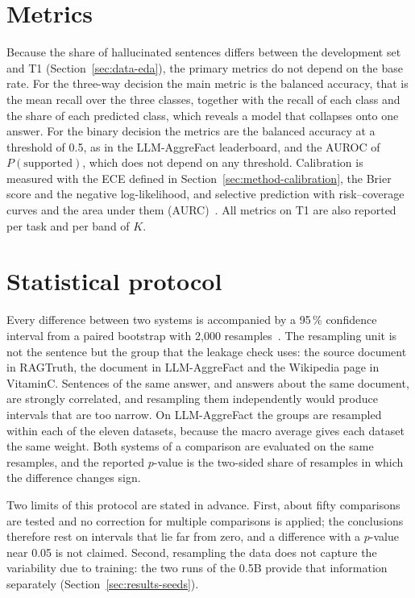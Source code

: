 \section{Metrics}
\label{sec:setup-metrics}

Because the share of hallucinated sentences differs between the development set and T1
(Section~\ref{sec:data-eda}), the primary metrics do not depend on the base rate. For the three-way decision the main
metric is the balanced accuracy, that is the mean recall over the three classes, together with the recall of each class
and the share of each predicted class, which reveals a model that collapses onto one answer. For the binary decision
the metrics are the balanced accuracy at a threshold of 0.5, as in the LLM-AggreFact leaderboard, and the AUROC of
$P(\text{supported})$, which does not depend on any threshold. Calibration is measured with the ECE defined in
Section~\ref{sec:method-calibration}, the Brier score and the negative log-likelihood, and selective prediction with
risk--coverage curves and the area under them (AURC)~\cite{geifman2017selective}. All metrics on T1 are also reported
per task and per band of $K$.

\section{Statistical protocol}
\label{sec:setup-statistics}

Every difference between two systems is accompanied by a 95\,\% confidence interval from a paired bootstrap with 2{,}000
resamples~\cite{koehn2004significance,bergkirkpatrick2012significance,dror2018hitchhiker}. The resampling unit is not the
sentence but the group that the leakage check uses: the source document in RAGTruth, the document in LLM-AggreFact and
the Wikipedia page in VitaminC. Sentences of the same answer, and answers about the same document, are strongly
correlated, and resampling them independently would produce intervals that are too narrow. On LLM-AggreFact the groups
are resampled within each of the eleven datasets, because the macro average gives each dataset the same weight. Both
systems of a comparison are evaluated on the same resamples, and the reported $p$-value is the two-sided share of
resamples in which the difference changes sign.

Two limits of this protocol are stated in advance. First, about fifty comparisons are tested and no correction for
multiple comparisons is applied; the conclusions therefore rest on intervals that lie far from zero, and a difference
with a $p$-value near 0.05 is not claimed. Second, resampling the data does not capture the variability due to training:
the two runs of the 0.5B provide that information separately (Section~\ref{sec:results-seeds}).

